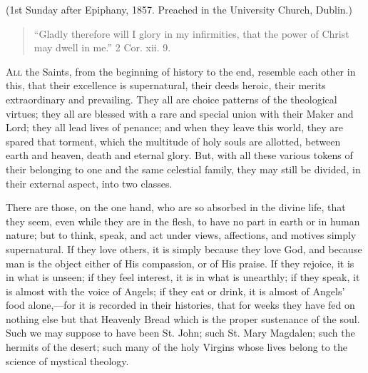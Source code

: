(1st Sunday after Epiphany, 1857. Preached in the
University Church, Dublin.)


\begin{quote}

``Gladly therefore will I glory in my
infirmities, that the power of Christ may dwell in
me.'' 2 Cor. xii. 9.

\end{quote}

A\textsc{ll} the Saints, from the beginning of history to the
end, resemble each other in this, that their excellence
is supernatural, their deeds heroic, their merits
extraordinary and prevailing. They all are choice
patterns of the theological virtues; they all are blessed
with a rare and special union with their Maker and Lord;
they all lead lives of penance; and when they leave this
world, they are spared that torment, which the multitude
of holy souls are allotted, between earth and heaven,
death and eternal glory. But, with all these various
tokens of their belonging to one and the same celestial
family, they may still be divided, in their external
aspect, into two classes.

There are those, on the one hand, who are so absorbed
in the divine life, that they seem, even while they are
in the flesh, to have no part in earth or in human
nature; but to think, speak, and act under views,
affections, and motives simply supernatural. If they love
others, it is simply because they love God, and because
man is the object either of His compassion, or of His
praise. If they rejoice, it is in what is unseen; if they
feel interest, it is in what is unearthly; if they speak,
it is almost with the voice of Angels; if they eat or
drink, it is almost of Angels' food alone,—for it is
recorded in their histories, that for weeks they have fed
on nothing else but that Heavenly Bread which is the
proper sustenance of the soul. Such we may suppose to
have been St. John; such St. Mary Magdalen; such the
hermits of the desert; such many of the holy Virgins
whose lives belong to the science of mystical theology.

